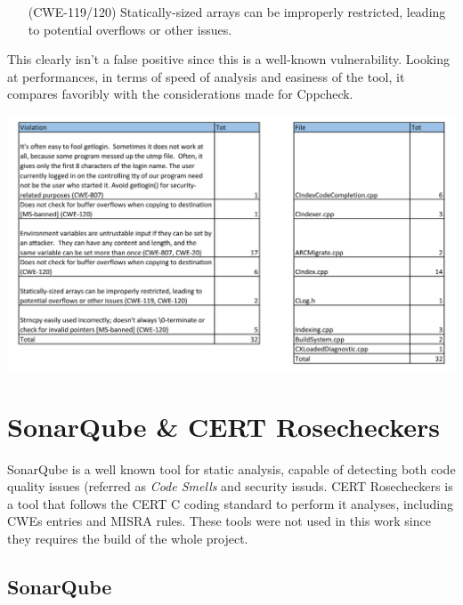 \begin{itemize}
	\item[(CWE-119/120) ] Statically-sized arrays can be improperly restricted, leading to potential overflows or other issues.
\end{itemize}

This clearly isn't a false positive since this is a well-known vulnerability.\newline\newline
Looking at performances, in terms of speed of analysis and easiness of the tool, it compares favoribly with the considerations made for Cppcheck.

\pagebreak

\begin{minipage}{\linewidth}
	\includegraphics[width=\textwidth]{img/Flawfinder_Summary.jpg}
\end{minipage}

\pagebreak


\section{SonarQube \& CERT Rosecheckers}

SonarQube is a well known tool for static analysis, capable of detecting both code quality issues (referred as \textsl{Code Smells} and security issuds.\newline
CERT Rosecheckers is a tool that follows the CERT C coding standard to perform it analyses, including CWEs entries and MISRA rules.\newline\newline
These tools were not used in this work since they requires the build of the whole project.

\subsection{SonarQube}

